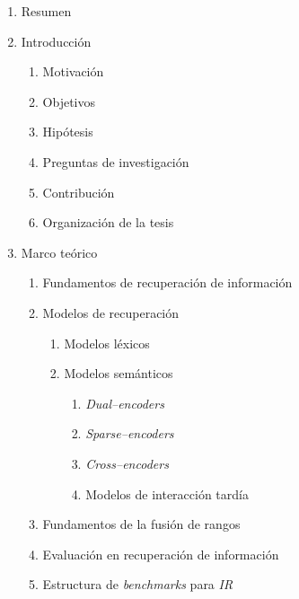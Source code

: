 \documentclass[12pt]{article}
\begin{document}
    \begin{enumerate}
        \item Resumen
        
        \item Introducción
        \begin{enumerate}
            \item Motivación
            \item Objetivos
            \item Hipótesis
            \item Preguntas de investigación
            \item Contribución
            \item Organización de la tesis
        \end{enumerate}
        
        \item Marco teórico
        \begin{enumerate}
            \item Fundamentos de recuperación de información
            
            \item Modelos de recuperación
            \begin{enumerate}
                \item Modelos léxicos
                \item Modelos semánticos
                \begin{enumerate}
                    \item \textit{Dual--encoders}
                    
                    \item \textit{Sparse--encoders}
                    
                    \item \textit{Cross--encoders}
                    
                    \item Modelos de interacción tardía
                \end{enumerate}
            \end{enumerate}
            
            \item Fundamentos de la fusión de rangos
            
            \item Evaluación en recuperación de información
            
            \item Estructura de \textit{benchmarks} para \textit{IR}
            

\end{enumerate}
\end{enumerate}
\end{document}
